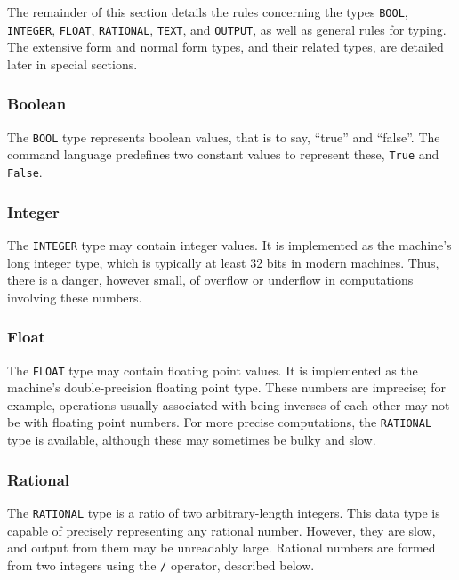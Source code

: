 \medskip

The remainder of this section details the rules concerning the types
{\tt BOOL}, {\tt INTEGER}, {\tt FLOAT}, {\tt RATIONAL}, {\tt TEXT}, and
{\tt OUTPUT}, as well as general rules for typing.  The extensive form
and normal form types, and their related types, are detailed later in
special sections.

\subsubsection{Boolean}

The {\tt BOOL} type represents boolean values, that is to say, ``true'' and
``false''.  The command language predefines two constant values to
represent these, {\tt True} and {\tt False}.

\subsubsection{Integer}

The {\tt INTEGER} type may contain integer values.  It is implemented
as the machine's long integer type, which is typically at least 32
bits in modern machines.  Thus, there is a danger, however small, of
overflow or underflow in computations involving these numbers.

\subsubsection{Float}

The {\tt FLOAT} type may contain floating point values.  It is implemented
as the machine's double-precision floating point type.  These numbers
are imprecise; for example, operations usually associated with being inverses
of each other may not be with floating point numbers.  For more precise
computations, the {\tt RATIONAL} type is available, although these may
sometimes be bulky and slow.

\subsubsection{Rational}

The {\tt RATIONAL} type is a ratio of two arbitrary-length integers.
This data type is capable of precisely representing any rational
number.  However, they are slow, and output from them may be
unreadably large.  Rational numbers are formed from two integers using
the {\tt /} operator, described below.


